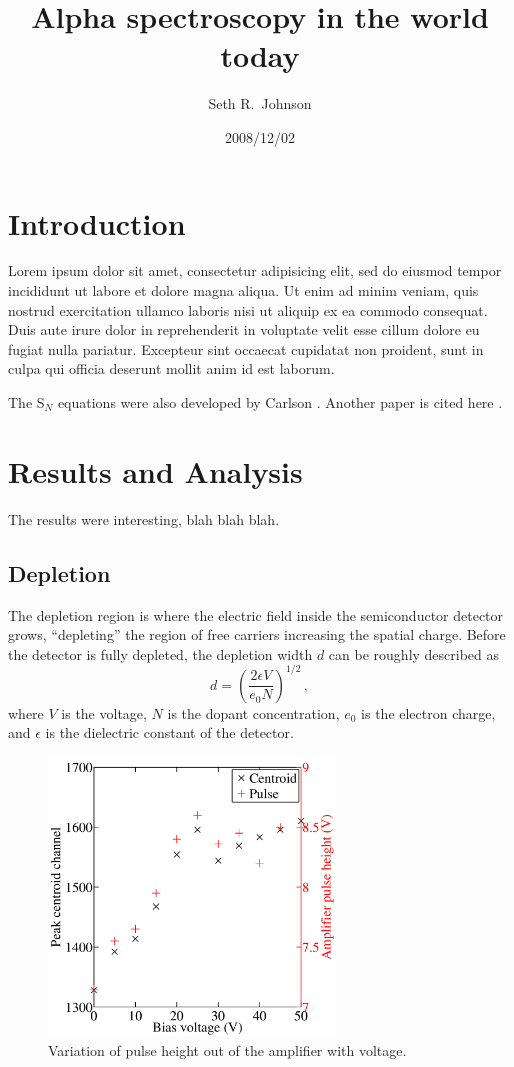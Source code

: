 \documentclass{anstrans}
\title{Alpha spectroscopy in the world today}
\author{Seth R.~Johnson}
\institute{Department of Nuclear Engineering \& Radiological Sciences, University of Michigan, Ann Arbor, MI, 48109}
\date{2008/12/02}
\newcommand{\SN}{S$_N$}%
\begin{document}
\section{Introduction}
Lorem ipsum dolor sit amet, consectetur adipisicing elit, sed do eiusmod tempor
incididunt ut labore et dolore magna aliqua. Ut enim ad minim veniam, quis
nostrud exercitation ullamco laboris nisi ut aliquip ex ea commodo consequat.
Duis aute irure dolor in reprehenderit in voluptate velit esse cillum dolore eu
fugiat nulla pariatur. Excepteur sint occaecat cupidatat non proident, sunt in
culpa qui officia deserunt mollit anim id est laborum.

The \SN{} equations were also developed by Carlson \cite{Car1953}. Another
paper is cited here \cite{Lar2008}.
\section{Results and Analysis}
The results were interesting, blah blah blah.
\subsection{Depletion}
The depletion region is where the electric field inside the semiconductor
detector grows, ``depleting'' the region of free carriers increasing the
spatial charge. Before the
detector is fully depleted, the depletion width $d$ can be roughly described as
$$ d = \left( \frac{2\epsilon V}{e_0 N} \right)^{1/2} \,,$$
where $V$ is the voltage,  $N$ is the dopant concentration, $e_0$ is the
electron charge, and $\epsilon$ is the dielectric constant of the detector.

\begin{figure}[b]
  \centering
  \includegraphics[width=3in]{NERS515_lab9_voltage}
  \caption{Variation of pulse height out of the amplifier with voltage.}
  \label{fig:voltage}
\end{figure}
\end{document}
